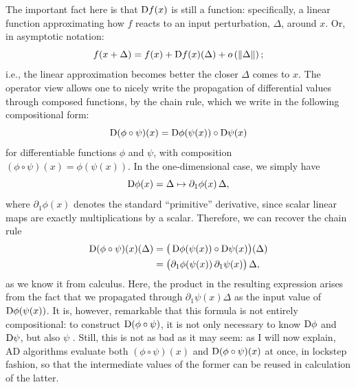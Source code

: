 The important fact here is that \(\mathop{}\!\mathrm{D} f(x)\) is still a function: specifically, a linear function
approximating how \(f\) reacts to an input perturbation, \(\Delta\), around \(x\).  Or, in
asymptotic notation:
\begin{equation}
  f(x + \Delta) = f(x) + \mathop{}\!\mathrm{D} f(x)(\Delta) + o\left(\left\lVert\Delta\right\rVert\right);
\end{equation}
i.e., the linear approximation becomes better the closer \(\Delta\) comes to \(x\).  The operator
view allows one to nicely write the propagation of differential values through composed functions,
by the chain rule, which we write in the following compositional form:
\begin{equation}
  \mathop{}\!\mathrm{D}(\phi \circ \psi)(x) = \mathop{}\!\mathrm{D}\phi(\psi(x)) \circ \mathop{}\!\mathrm{D}\psi(x)
\end{equation}
for differentiable functions \(\phi\) and \(\psi\), with composition
\((\phi \circ \psi)(x) = \phi(\psi(x))\).  In the one-dimensional case, we simply have
\begin{equation}
  \mathop{}\!\mathrm{D} \phi(x) = \Delta \mapsto \partial_1 \phi(x) \, \Delta,
\end{equation}
where \(\partial_1 \phi(x)\) denotes the standard \enquote{primitive} derivative, since scalar
linear maps are exactly multiplications by a scalar.  Therefore, we can recover the chain rule
\begin{equation}
  \begin{aligned}
    \mathop{}\!\mathrm{D}(\phi \circ \psi)(x)(\Delta) &=
    \big( \mathop{}\!\mathrm{D}\phi(\psi(x)) \circ \mathop{}\!\mathrm{D}\psi(x) \big)(\Delta) \\
    &= \big( \partial_1\phi(\psi(x)) \, \partial_1 \psi(x) \big) \, \Delta,
  \end{aligned}
\end{equation}
as we know it from calculus.  Here, the product in the resulting expression arises from the fact
that we propagated through \(\partial_1 \psi(x) \Delta\) as the input value of
\(\mathop{}\!\mathrm{D}\phi(\psi(x))\).  It is, however, remarkable that this formula is not entirely compositional:
to construct \(\mathop{}\!\mathrm{D}(\phi \circ \psi)\), it is not only necessary to know \(\mathop{}\!\mathrm{D}\phi\) and
\(\mathop{}\!\mathrm{D}\psi\), but also \(\psi\) \parencite{elliott2018simple}.  Still, this is not as bad as it may
seem: as I will now explain, AD algorithms evaluate both \((\phi \circ \psi)(x)\) and
\(\mathop{}\!\mathrm{D}(\phi \circ \psi)(x)\) at once, in lockstep fashion, so that the intermediate values of the
former can be reused in calculation of the latter.

